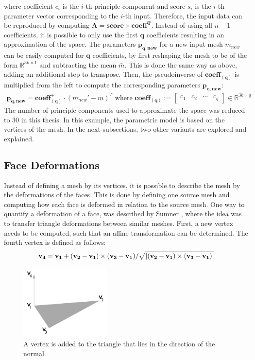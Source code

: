 where coefficient $c_i$ is the $i$-th principle component and score $s_i$ is the $i$-th parameter vector corresponding to the $i$-th input. Therefore, the input data can be reproduced by computing $\mathbf{A = score \times {coeff}^T}$. Instead of using all $n-1$ coefficients, it is possible to only use the first $\mathbf{q}$ coefficients resulting in an approximation of the space. The parameters $\mathbf{p_{q,new}}$ for a new input mesh $m_{new}$ can be easily computed for $\mathbf{q}$ coefficients, by first reshaping the mesh to be of the form $\mathbb{R}^{3k \times 1}$ and subtracting the mean $\bar{m}$. This is done the same way as above, adding an additional step to transpose. Then, the pseudoinverse of $\mathbf{coeff_{(q)}}$ is multiplied from the left to compute the corresponding parameters $\mathbf{p_{q,new}}$:
\begin{gather}
\mathbf{p_{q,new}} = \mathbf{coeff^+_{(q)}} \cdot (m_{new}' - \bar{m})^T  \text{  where }
\mathbf{coeff_{(q)}} :=
\begin{bmatrix}
 c_1&c_2&\cdots&c_{q}
\end{bmatrix}
\in \mathbb{R}^{3k \times q}
\end{gather}
The number of principle components used to approximate the space was reduced to $30$ in this thesis. In this example, the parametric model is based on the vertices of the mesh. In the next subsections, two other variants are explored and explained.
\subsection{Face Deformations}
\label{faceDeform}
Instead of defining a mesh by its vertices, it is possible to describe the mesh by the deformations of the faces. This is done by defining one source mesh and computing how each face is deformed in relation to the source mesh. One way to quantify a deformation of a face, was described by Sumner \cite{sumner2004deformation}, where the idea was to transfer triangle deformations between similar meshes. First, a new vertex needs to be computed, such that an affine transformation can be determined. The fourth vertex is defined as follows:
\begin{gather}
  \mathbf{v_4} = \mathbf{v_1} + (\mathbf{v_2} - \mathbf{v_1})\times(\mathbf{v_3}-\mathbf{v_1})/\sqrt{\lvert(\mathbf{v_2}-\mathbf{v_1})\times(\mathbf{v_3}-\mathbf{v_1})\rvert} \label{normalequation}
\end{gather}

\begin{figure}[h]
\centering
\includegraphics[width=0.4\textwidth]{figures/normal}
\caption[Diagram point on normal]{A vertex is added to the triangle that lies in the direction of the normal.}
\label{fig:normal}
\end{figure}

